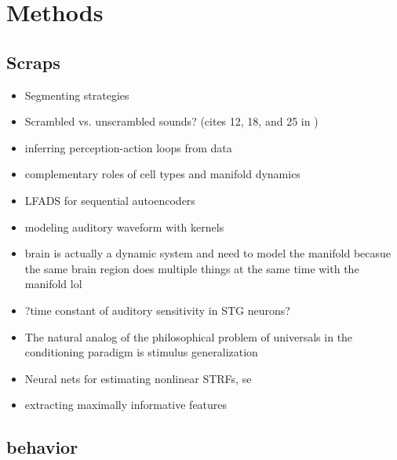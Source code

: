 
% 

\section{Methods}
\begin{multicols}{2}
\subsection{Scraps}


\begin{itemize}
\item Segmenting strategies \cite{ashwoodMiceAlternateDiscrete2020}
\item Scrambled vs. unscrambled sounds? (cites 12, 18, and 25 in \cite{norman-haignereHierarchicalIntegrationMultiple2020})
\item inferring perception-action loops from data \cite{rosasCausalBlanketsTheory2020}
\item complementary roles of cell types and manifold dynamics \cite{dubreuilComplementaryRolesDimensionality2020}
\item LFADS for sequential autoencoders \cite{pandarinathInferringSingletrialNeural2018}
\item modeling auditory waveform with kernels \cite{smithEfficientAuditoryCoding2006a}
\item brain is actually a dynamic system and need to model the manifold \cite{brembsBrainDynamicallyActive2020} becasue the same brain region does multiple things at the same time with the manifold lol \cite{gallegoCorticalPopulationActivity2018}
\item ?time constant of auditory sensitivity in STG neurons?
\item The natural analog of the philosophical problem of universals in the conditioning paradigm is stimulus generalization \cite{roschWittgensteinCategorizationResearch1987}	
\item Neural nets for estimating nonlinear STRFs, se \cite{kingRecentAdvancesUnderstanding2018a}
\item extracting maximally informative features \cite{liuOptimalFeaturesAuditory2019}
\end{itemize}

\subsection{behavior}


\end{multicols}
